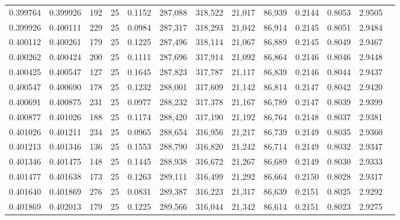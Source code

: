 \begin{tabular}{rrrrrrrrrrrrr}
0.399764 & 0.399926 &   192 &  25 &                                     0.1152 & 287,088 & 318,522 &  21,017 &  86,939 & 0.2144 & 0.8053 & 2.9505 \\
0.399926 & 0.400111 &   229 &  25 &                                     0.0984 & 287,317 & 318,293 &  21,042 &  86,914 & 0.2145 & 0.8051 & 2.9484 \\
0.400112 & 0.400261 &   179 &  25 &                                     0.1225 & 287,496 & 318,114 &  21,067 &  86,889 & 0.2145 & 0.8049 & 2.9467 \\
0.400262 & 0.400424 &   200 &  25 &                                     0.1111 & 287,696 & 317,914 &  21,092 &  86,864 & 0.2146 & 0.8046 & 2.9448 \\
0.400425 & 0.400547 &   127 &  25 &                                     0.1645 & 287,823 & 317,787 &  21,117 &  86,839 & 0.2146 & 0.8044 & 2.9437 \\
0.400547 & 0.400690 &   178 &  25 &                                     0.1232 & 288,001 & 317,609 &  21,142 &  86,814 & 0.2147 & 0.8042 & 2.9420 \\
0.400691 & 0.400875 &   231 &  25 &                                     0.0977 & 288,232 & 317,378 &  21,167 &  86,789 & 0.2147 & 0.8039 & 2.9399 \\
0.400877 & 0.401026 &   188 &  25 &                                     0.1174 & 288,420 & 317,190 &  21,192 &  86,764 & 0.2148 & 0.8037 & 2.9381 \\
0.401026 & 0.401211 &   234 &  25 &                                     0.0965 & 288,654 & 316,956 &  21,217 &  86,739 & 0.2149 & 0.8035 & 2.9360 \\
0.401213 & 0.401346 &   136 &  25 &                                     0.1553 & 288,790 & 316,820 &  21,242 &  86,714 & 0.2149 & 0.8032 & 2.9347 \\
0.401346 & 0.401475 &   148 &  25 &                                     0.1445 & 288,938 & 316,672 &  21,267 &  86,689 & 0.2149 & 0.8030 & 2.9333 \\
0.401477 & 0.401638 &   173 &  25 &                                     0.1263 & 289,111 & 316,499 &  21,292 &  86,664 & 0.2150 & 0.8028 & 2.9317 \\
0.401640 & 0.401869 &   276 &  25 &                                     0.0831 & 289,387 & 316,223 &  21,317 &  86,639 & 0.2151 & 0.8025 & 2.9292 \\
0.401869 & 0.402013 &   179 &  25 &                                     0.1225 & 289,566 & 316,044 &  21,342 &  86,614 & 0.2151 & 0.8023 & 2.9275 \\

\end{tabular}
